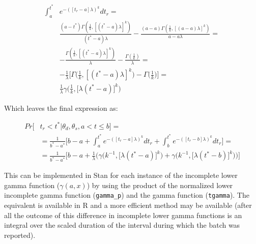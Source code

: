 \begin{align}
		\int_a^{t^*} & e^{-([t_r-a]\lambda)^k} dt_r = \\
			& \frac{(a-t^*)\Gamma(\frac{1}{k},[(t^*-a)\lambda]^k)}{(t^*-a)\lambda} -
			  \frac{(a-a  )\Gamma(\frac{1}{k},[(a  -a)\lambda]^k)}{ a  -a \lambda} = \\
			& -\frac{\Gamma(\frac{1}{k},[(t^*-a)\lambda]^k)}{\lambda} -
			  \frac{\Gamma(\frac{1}{k})}{\lambda} = \\
			& -\frac{1}{\lambda} \Bigg[
				\Gamma\bigg(\frac{1}{k},[(t^*-a)\lambda]^k\bigg) -
				\Gamma\bigg(\frac{1}{k}\bigg)
				\Bigg] = \\
			& \frac{1}{\lambda} \gamma\bigg(\frac{1}{k},\big[\lambda(t^*-a)\big]^k\bigg)
\end{align}

Which leaves the final expression as:

\begin{align}
Pr[&t_r < t^*| \theta_d, \theta_s, a<t\le b] =  \\
	&= \frac{1}{b^*-a^*} \Bigg[
		b - a +
		\int_a^{t^*} e^{-([t_r-a]\lambda)^k} dt_r +
		\int_b^{t^*} e^{-([t_r-b]\lambda)^k} dt_r 
	\Bigg] = \\
	&= \frac{1}{b^*-a^*} \Bigg[
		b - a + \frac{1}{\lambda} \bigg(
			\gamma\big(k^{-1},\big[\lambda(t^*-a)\big]^k\big) + 
			\gamma\big(k^{-1},\big[\lambda(t^*-b)\big]^k\big)
		\bigg)
	\Bigg]
\end{align}

This can be implemented in Stan for each instance of the incomplete
lower gamma function ($\gamma(a,x)$) by using the product of the normalized lower
incomplete gamma function (\verb#gamma_p#) and the gamma function
(\verb#tgamma#).  The equivalent is available in R and a more efficient 
method may be available (after all the outcome of this difference in
incomplete lower gamma functions is an integral over the scaled duration
of the interval during which the batch was reported).




